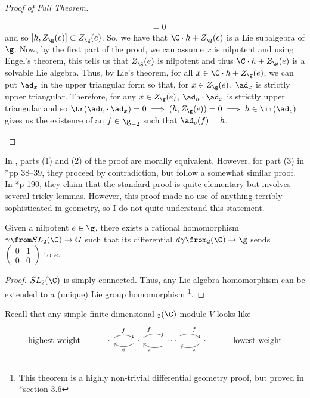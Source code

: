 \documentclass[springer-theory-notes.tex]{subfiles}
\begin{document}
\begin{proof}[Proof of Full Theorem]
\begin{enumerate}[label=(\arabic*)]
\begin{align*}
                & = 0
    \end{align*}
    and so \([h,Z_\g(e)] \subset Z_\g(e)\). So, we have that \(\C
    \cdot h + Z_\g(e)\) is a Lie subalgebra of \(\g\). Now, by the
    first part of the proof, we can assume \(x\) is nilpotent and
    using Engel's theorem, this tells us that \(Z_\g(e)\) is
    nilpotent and thus \(\C \cdot h + Z_\g(e)\) is a solvable Lie
    algebra. Thus, by Lie's theorem, for all \(x \in \C \cdot h +
    Z_\g(e)\), we can put \(\ad_x\) in the upper triangular form so
    that, for \(x \in Z_\g(e)\), \(\ad_x\) is strictly upper
    triangular. Therefore, for any \(x \in Z_\g(e)\), \(\ad_h \cdot
    \ad_x\) is strictly upper triangular and so \(\tr(\ad_h \cdot
    \ad_x) = 0 \implies (h,Z_\g(e)) = 0 \implies h \in \im(\ad_e)\)
    gives us the existence of an \(f \in \g_{-2}\) such that
    \(\ad_e(f) = h\). 
  \end{enumerate}
\end{proof}
\begin{rmk}
  In \cite{cm}, parts (1) and (2) of the proof are morally
  equivalent. However, for part (3) in \cite{cm}*{pp 38--39}, they proceed by
  contradiction, but follow a somewhat similar proof. In \cite{cg}*{p
    190}, they claim that the standard proof is quite elementary but
  involves several tricky lemmas. However, this proof made no use of
  anything terribly sophisticated in geometry, so I do not quite
  understand this statement.
\end{rmk}
\begin{cor}
  Given a nilpotent \(e \in \g\), there exists a rational homomorphism
  \(\gamma \from SL_2(\C) \to G\) such that its differential \(d\gamma
  \from \sl_2(\C) \to \g\) sends \(\left(
    \begin{array}{cc}
      0&1\\
      0&0
    \end{array}
\right)\) to \(e\).
\end{cor}
\begin{proof}
  \(SL_2(\C)\) is simply connected. Thus, any Lie algebra homomorphism
  can be extended to a (unique) Lie group homomorphism \footnote{This
    theorem is a highly non-trivial differential geometry proof, but
    proved in \cite{hall}*{section 3.6}}. 
\end{proof}
Recall that any simple finite dimensional \(\sl_2(\C)\)-module \(V\)
looks like \[
  \begin{tikzcd}
    \text{highest weight} & \cdot \ar[r, bend left, "f"] & \ar[l, bend
    left, "e"] \cdot \ar[r, bend left, "f"] & \ar[l, bend
    left, "e"] \cdots  \ar[r, bend left, "f"] & \ar[l, bend
    left, "e"] \cdot & \text{lowest weight}
  \end{tikzcd}
\]
\end{document}
